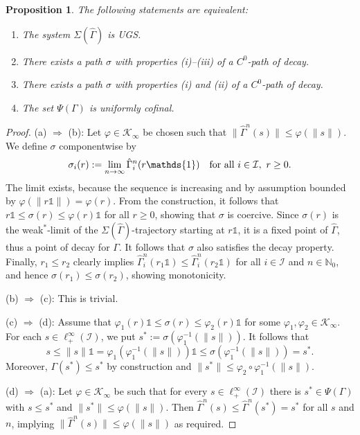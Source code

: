 \documentclass[10pt, oneside, a4paper]{article}
\newcommand{\N}{\mathbb{N}}
\newcommand{\unit}{\mathds{1}}
\newcommand{\IC}{\mathcal{I}}
\newcommand{\KC}{\mathcal{K}}
\newtheorem{proposition}{Proposition}[section]
\begin{document}
\begin{proposition}\label{prop_hatsigma_ugs}
The following statements are equivalent:%
\begin{enumerate}
\item[(a)] The system $\Sigma(\hat{\Gamma})$ is UGS.%
\item[(b)] There exists a path $\sigma$ with properties (i)--(iii) of a $C^0$-path of decay.%
\item[(c)] There exists a path $\sigma$ with properties (i) and (ii) of a $C^0$-path of decay.%
\item[(d)] The set $\Psi(\Gamma)$ is uniformly cofinal.%
\end{enumerate}
\end{proposition}

\begin{proof}
(a) $\Rightarrow$ (b): Let $\varphi \in \KC_{\infty}$ be chosen such that $\|\hat{\Gamma}^n(s)\| \leq \varphi(\|s\|)$. We define $\sigma$ componentwise by%
\begin{equation}\label{eq_def_sigmai}
  \sigma_i(r) := \lim_{n \rightarrow \infty}\hat{\Gamma}^n_i(r\unit) \mbox{\quad for all\ } i \in \IC, \ r \geq 0.%
\end{equation}
The limit exists, because the sequence is increasing and by assumption bounded by $\varphi(\|r\unit\|) = \varphi(r)$. From the construction, it follows that $r\unit \leq \sigma(r) \leq \varphi(r)\unit$ for all $r \geq 0$, showing that $\sigma$ is coercive. Since $\sigma(r)$ is the weak$^*$-limit of the $\Sigma(\hat{\Gamma})$-trajectory starting at $r\unit$, it is a fixed point of $\hat{\Gamma}$, thus a point of decay for $\Gamma$. It follows that $\sigma$ also satisfies the decay property. Finally, $r_1 \leq r_2$ clearly implies $\hat{\Gamma}^n_i(r_1\unit) \leq \hat{\Gamma}^n_i(r_2\unit)$ for all $i \in \IC$ and $n \in \N_0$, and hence $\sigma(r_1) \leq \sigma(r_2)$, showing monotonicity.%

(b) $\Rightarrow$ (c): This is trivial.%

(c) $\Rightarrow$ (d): Assume that $\varphi_1(r)\unit \leq \sigma(r) \leq \varphi_2(r)\unit$ for some $\varphi_1,\varphi_2 \in \KC_{\infty}$. For each $s \in \ell^{\infty}_+(\IC)$, we put $s^* := \sigma(\varphi_1^{-1}(\|s\|))$. It follows that%
\begin{equation*}
  s \leq \|s\|\unit = \varphi_1(\varphi_1^{-1}(\|s\|))\unit \leq \sigma(\varphi_1^{-1}(\|s\|)) = s^*.%
\end{equation*}
Moreover, $\Gamma(s^*) \leq s^*$ by construction and $\|s^*\| \leq \varphi_2 \circ \varphi_1^{-1}(\|s\|)$.%

(d) $\Rightarrow$ (a): Let $\varphi \in \KC_{\infty}$ be such that for every $s \in \ell^{\infty}_+(\IC)$ there is $s^* \in \Psi(\Gamma)$ with $s \leq s^*$ and $\|s^*\| \leq \varphi(\|s\|)$. Then $\hat{\Gamma}^n(s) \leq \hat{\Gamma}^n(s^*) = s^*$ for all $s$ and $n$, implying $\|\hat{\Gamma}^n(s)\| \leq \varphi(\|s\|)$ as required.
\end{proof}
\end{document}
